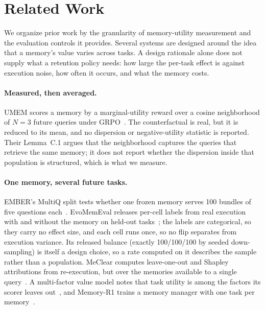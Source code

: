 \section{Related Work}
\label{sec:related}
We organize prior work by the granularity of memory-utility measurement and
the evaluation controls it provides. Several systems are designed around the
idea that a memory's value varies across tasks. A design rationale alone does
not supply what a retention policy needs:
how large the per-task effect is against execution noise, how often it
occurs, and what the memory costs.

\paragraph{Measured, then averaged.}
UMEM scores a memory by a marginal-utility reward over a cosine neighborhood
of $N{=}3$ future queries under GRPO~\cite{umem}. The counterfactual is real,
but it is reduced to its mean, and no dispersion or negative-utility
statistic is reported. Their Lemma~C.1 argues that the neighborhood captures
the queries that retrieve the same memory; it does not report whether the
dispersion inside that population is structured, which is what we measure.

\paragraph{One memory, several future tasks.}
EMBER's MultiQ split tests whether one frozen memory serves 100 bundles of
five questions each~\cite{ember}. EvoMemEval releases per-cell labels from
real execution with and without the memory on held-out tasks~\cite{evomemeval}; the labels
are categorical, so they carry no effect size, and each cell runs once, so no
flip separates from execution variance. Its released balance (exactly
100/100/100 by seeded down-sampling) is itself a design choice, so a rate
computed on it describes the sample rather than a population. MeClear computes leave-one-out and
Shapley attributions from re-execution, but over the memories available to a
single query~\cite{meclear}. A multi-factor value model notes that task
utility is among the factors its scorer leaves out~\cite{multifactor}, and Memory-R1 trains a memory manager with one
task per memory~\cite{memoryrone}.

